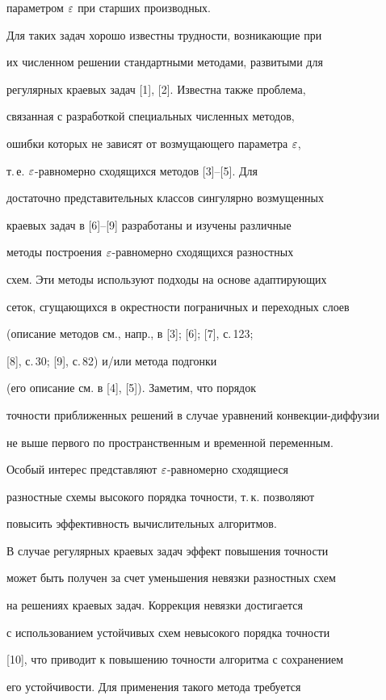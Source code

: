 параметром $\varepsilon$ при старших производных.


Для таких задач хорошо известны трудности, возникающие при


их численном решении стандартными методами, развитыми для


регулярных краевых задач [1], [2]. Известна также проблема,


связанная с разработкой специальных численных методов,


ошибки которых не зависят от возмущающего параметра $\varepsilon$,


т.\,е. $\varepsilon$-равномерно сходящихся методов [3]--[5]. Для


достаточно представительных классов сингулярно возмущенных


краевых задач в [6]--[9] разработаны и изучены различные


методы построения $\varepsilon$-равномерно сходящихся  разностных


схем. Эти методы используют подходы на основе адаптирующих


сеток, сгущающихся в окрестности пограничных и переходных слоев


(описание методов см., напр., в [3]; [6]; [7], с.\,123;


[8], с.\,30; [9], с.\,82) и/или метода подгонки


(его описание см. в [4], [5]). Заметим, что порядок


точности приближенных решений в случае уравнений конвекции-диффузии


не выше первого по пространственным и временной переменным.


Особый интерес представляют $\varepsilon$-равномерно сходящиеся


разностные схемы высокого порядка точности, т.\,к. позволяют


повысить эффективность вычислительных алгоритмов.





В случае регулярных краевых задач эффект повышения точности


может быть получен за счет уменьшения невязки разностных схем


на решениях краевых задач. Коррекция невязки достигается


с использованием устойчивых схем невысокого порядка точности


[10], что приводит к повышению точности алгоритма с сохранением


его устойчивости. Для применения такого метода требуется


